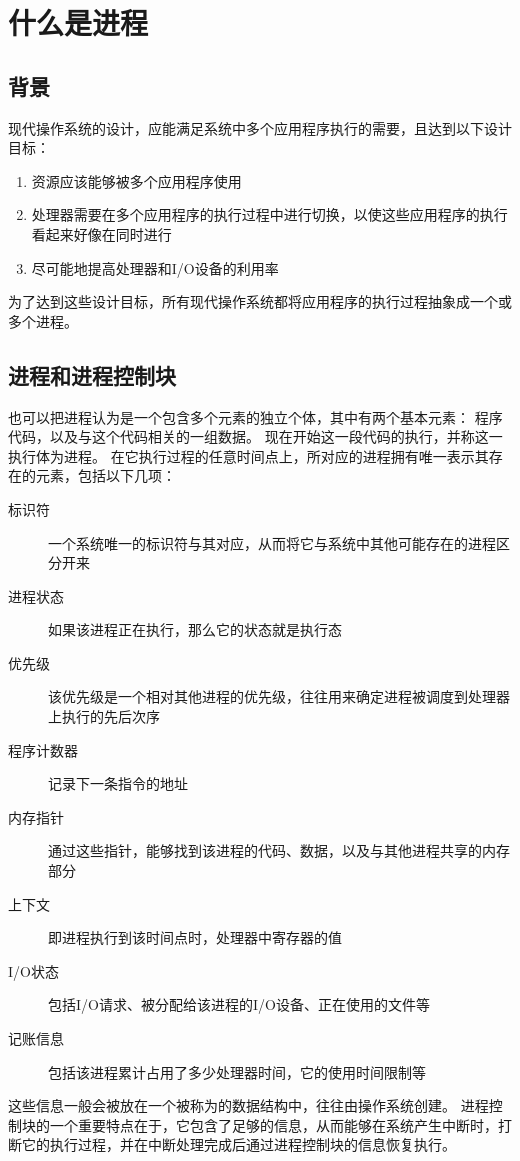 
\section{什么是进程}
{
    \subsection{背景}
    {
        现代操作系统的设计，应能满足系统中多个应用程序执行的需要，且达到以下设计目标：

        \begin{enumerate}
            \item 资源应该能够被多个应用程序使用
            \item 处理器需要在多个应用程序的执行过程中进行切换，以使这些应用程序的执行看起来好像在同时进行
            \item 尽可能地提高处理器和I/O设备的利用率
        \end{enumerate}

        为了达到这些设计目标，所有现代操作系统都将应用程序的执行过程抽象成一个或多个进程。
    }

    \subsection{进程和进程控制块}
    {
        也可以把进程认为是一个包含多个元素的独立个体，其中有两个基本元素：
        程序代码，以及与这个代码相关的一组数据。
        现在开始这一段代码的执行，并称这一执行体为进程。
        在它执行过程的任意时间点上，所对应的进程拥有唯一表示其存在的元素，包括以下几项：

        \begin{description}
            \item[标识符] 一个系统唯一的标识符与其对应，从而将它与系统中其他可能存在的进程区分开来
            \item[进程状态] 如果该进程正在执行，那么它的状态就是执行态
            \item[优先级] 该优先级是一个相对其他进程的优先级，往往用来确定进程被调度到处理器上执行的先后次序
            \item[程序计数器] 记录下一条指令的地址
            \item[内存指针] 通过这些指针，能够找到该进程的代码、数据，以及与其他进程共享的内存部分
            \item[上下文]  即进程执行到该时间点时，处理器中寄存器的值
            \item[I/O状态] 包括I/O请求、被分配给该进程的I/O设备、正在使用的文件等
            \item[记账信息] 包括该进程累计占用了多少处理器时间，它的使用时间限制等
        \end{description}

        这些信息一般会被放在一个被称为的数据结构中，往往由操作系统创建。
        进程控制块的一个重要特点在于，它包含了足够的信息，从而能够在系统产生中断时，打断它的执行过程，并在中断处理完成后通过进程控制块的信息恢复执行。
    }
}
